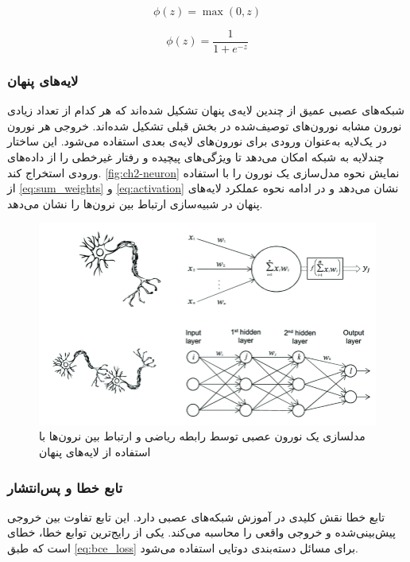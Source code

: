\begin{latin}
\begin{equation}
\label{eq:relu}
\phi(z) = \max(0, z)
\end{equation}
\end{latin}

\begin{latin}
\begin{equation}
\label{eq:sigmoid}
\phi(z) = \frac{1}{1 + e^{-z}}
\end{equation}
\end{latin}


\subsubsection{لایه‌های پنهان}
شبکه‌های عصبی عمیق از چندین لایه‌ی پنهان تشکیل شده‌اند که هر کدام از تعداد زیادی نورون مشابه نورون‌های توصیف‌شده در بخش قبلی تشکیل شده‌اند. خروجی هر نورون در یک‌لایه به‌عنوان ورودی برای نورون‌های لایه‌ی بعدی استفاده می‌شود. این ساختار چندلایه به شبکه امکان می‌دهد تا ویژگی‌های پیچیده و  رفتار غیرخطی را از داده‌های ورودی استخراج کند.
\autoref{fig:ch2-neuron}
نمایش نحوه مدل‌سازی یک نورون را با استفاده از 
\autoref{eq:sum_weights} و \autoref{eq:activation}
نشان می‌دهد و در ادامه نحوه عملکرد لایه‌های پنهان در شبیه‌سازی ارتباط بین نرون‌ها را نشان می‌دهد. 
\begin{figure}[h]
\centering
\includegraphics[width=1.0\linewidth]{Images/Chapter2/neuron}
\caption{مدلسازی یک نورون عصبی توسط رابطه ریاضی و ارتباط بین نرون‌ها با استفاده از لایه‌های پنهان
\cite{brainmentorsIntroductionDeep}}
\label{fig:ch2-neuron}
\end{figure}


\subsubsection{تابع خطا و پس‌انتشار
\protect{}}
تابع خطا
  نقش کلیدی در آموزش شبکه‌های عصبی دارد. این تابع تفاوت بین خروجی پیش‌بینی‌شده
   و خروجی واقعی
     را محاسبه می‌کند. یکی از رایج‌ترین توابع خطا، خطای 
   است که طبق 
   \autoref{eq:bce_loss}
   برای مسائل دسته‌بندی دوتایی استفاده می‌شود.

